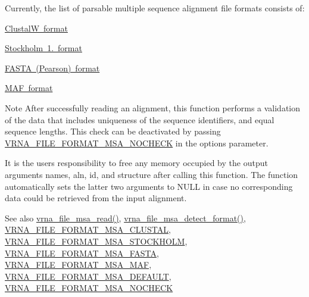 Currently, the list of parsable multiple sequence alignment file formats consists of\+:
\begin{DoxyItemize}
\item \mbox{\hyperlink{file_formats_msa-formats-clustal}{ClustalW format}}
\item \mbox{\hyperlink{file_formats_msa-formats-stockholm}{Stockholm 1. format}}
\item \mbox{\hyperlink{file_formats_msa-formats-fasta}{F\+A\+S\+TA (Pearson) format}}
\item \mbox{\hyperlink{file_formats_msa-formats-maf}{M\+AF format}}
\end{DoxyItemize}\begin{DoxyNote}{Note}
After successfully reading an alignment, this function performs a validation of the data that includes uniqueness of the sequence identifiers, and equal sequence lengths. This check can be deactivated by passing \mbox{\hyperlink{group__file__utils_ga229fb3778ecabea4782902b69fa48fd1}{V\+R\+N\+A\+\_\+\+F\+I\+L\+E\+\_\+\+F\+O\+R\+M\+A\+T\+\_\+\+M\+S\+A\+\_\+\+N\+O\+C\+H\+E\+CK}} in the {\ttfamily options} parameter.

It is the users responsibility to free any memory occupied by the output arguments {\ttfamily names}, {\ttfamily aln}, {\ttfamily id}, and {\ttfamily structure} after calling this function. The function automatically sets the latter two arguments to {\ttfamily N\+U\+LL} in case no corresponding data could be retrieved from the input alignment.
\end{DoxyNote}
\begin{DoxySeeAlso}{See also}
\mbox{\hyperlink{group__file__utils_ga08a01c40ac5f5e0e04e9ae2258c99aa6}{vrna\+\_\+file\+\_\+msa\+\_\+read()}}, \mbox{\hyperlink{group__file__utils_ga627ac281b5f11c63861726e6472626c9}{vrna\+\_\+file\+\_\+msa\+\_\+detect\+\_\+format()}}, \mbox{\hyperlink{group__file__utils_ga79a23de2c7249f2cccd762e475c81859}{V\+R\+N\+A\+\_\+\+F\+I\+L\+E\+\_\+\+F\+O\+R\+M\+A\+T\+\_\+\+M\+S\+A\+\_\+\+C\+L\+U\+S\+T\+AL}}, \mbox{\hyperlink{group__file__utils_ga62be992445cd8ab2ad7a8fded944338b}{V\+R\+N\+A\+\_\+\+F\+I\+L\+E\+\_\+\+F\+O\+R\+M\+A\+T\+\_\+\+M\+S\+A\+\_\+\+S\+T\+O\+C\+K\+H\+O\+LM}}, \mbox{\hyperlink{group__file__utils_gacf6274a2c825f34e4131404665b00604}{V\+R\+N\+A\+\_\+\+F\+I\+L\+E\+\_\+\+F\+O\+R\+M\+A\+T\+\_\+\+M\+S\+A\+\_\+\+F\+A\+S\+TA}}, \mbox{\hyperlink{group__file__utils_gab3186d774c01570d2a47d0308eec4927}{V\+R\+N\+A\+\_\+\+F\+I\+L\+E\+\_\+\+F\+O\+R\+M\+A\+T\+\_\+\+M\+S\+A\+\_\+\+M\+AF}}, \mbox{\hyperlink{group__file__utils_ga4acc255373831856a8417b68de8a94c0}{V\+R\+N\+A\+\_\+\+F\+I\+L\+E\+\_\+\+F\+O\+R\+M\+A\+T\+\_\+\+M\+S\+A\+\_\+\+D\+E\+F\+A\+U\+LT}}, \mbox{\hyperlink{group__file__utils_ga229fb3778ecabea4782902b69fa48fd1}{V\+R\+N\+A\+\_\+\+F\+I\+L\+E\+\_\+\+F\+O\+R\+M\+A\+T\+\_\+\+M\+S\+A\+\_\+\+N\+O\+C\+H\+E\+CK}}
\end{DoxySeeAlso}

